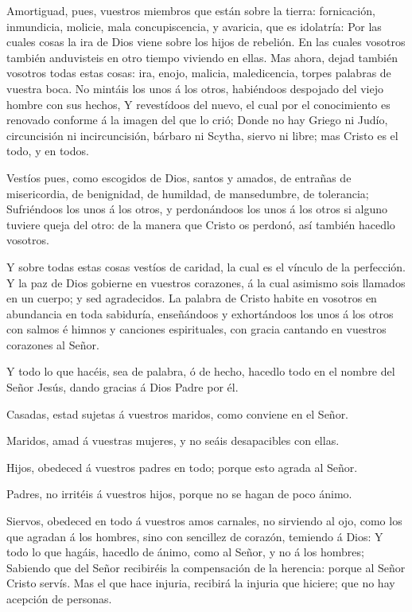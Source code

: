  Amortiguad, pues, vuestros miembros que están sobre la
tierra: fornicación, inmundicia, molicie, mala concupiscencia, y
avaricia, que es idolatría:  Por las cuales cosas la ira de
Dios viene sobre los hijos de rebelión.  En las cuales
vosotros también anduvisteis en otro tiempo viviendo en ellas.
 Mas ahora, dejad también vosotros todas estas cosas: ira,
enojo, malicia, maledicencia, torpes palabras de vuestra boca.
 No mintáis los unos á los otros, habiéndoos despojado del
viejo hombre con sus hechos,  Y revestídoos del nuevo, el
cual por el conocimiento es renovado conforme á la imagen del que lo
crió;  Donde no hay Griego ni Judío, circuncisión ni
incircuncisión, bárbaro ni Scytha, siervo ni libre; mas Cristo es el
todo, y en todos.

 Vestíos pues, como escogidos de Dios, santos y amados, de
entrañas de misericordia, de benignidad, de humildad, de mansedumbre, de
tolerancia;  Sufriéndoos los unos á los otros, y
perdonándoos los unos á los otros si alguno tuviere queja del otro: de
la manera que Cristo os perdonó, así también hacedlo vosotros.

 Y sobre todas estas cosas vestíos de caridad, la cual es
el vínculo de la perfección.  Y la paz de Dios gobierne en
vuestros corazones, á la cual asimismo sois llamados en un cuerpo; y sed
agradecidos.  La palabra de Cristo habite en vosotros en
abundancia en toda sabiduría, enseñándoos y exhortándoos los unos á los
otros con salmos é himnos y canciones espirituales, con gracia cantando
en vuestros corazones al Señor.

 Y todo lo que hacéis, sea de palabra, ó de hecho, hacedlo
todo en el nombre del Señor Jesús, dando gracias á Dios Padre por él.

 Casadas, estad sujetas á vuestros maridos, como conviene
en el Señor.

 Maridos, amad á vuestras mujeres, y no seáis desapacibles
con ellas.

 Hijos, obedeced á vuestros padres en todo; porque esto
agrada al Señor.

 Padres, no irritéis á vuestros hijos, porque no se hagan
de poco ánimo.

 Siervos, obedeced en todo á vuestros amos carnales, no
sirviendo al ojo, como los que agradan á los hombres, sino con sencillez
de corazón, temiendo á Dios:  Y todo lo que hagáis, hacedlo
de ánimo, como al Señor, y no á los hombres;  Sabiendo que
del Señor recibiréis la compensación de la herencia: porque al Señor
Cristo servís.  Mas el que hace injuria, recibirá la
injuria que hiciere; que no hay acepción de personas.

